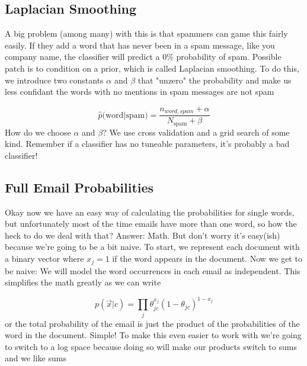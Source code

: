 \subsection{Laplacian Smoothing}
A big problem (among many) with this is that spammers can game this fairly easily. If they add a word that has never been in a spam message, like you company name, the classifier will predict a $0\%$ probability of spam. Possible patch is to condition on a prior, which is called Laplacian smoothing. To do this, we introduce two constants $\alpha$ and $\beta$ that "unzero" the probability and make us less confidant the words with no mentions in spam messages are not spam

\begin{equation}
    \hat{p}(\text{word|spam)} = \frac{n_{word,spam} + \alpha}{N_\text{spam} + \beta}
\end{equation}
How do we choose $\alpha$ and $\beta$? We use cross validation and a grid search of some kind. Remember if a classifier has no tuneable parameters, it's probably a bad classifier!

\subsection{Full Email Probabilities}
Okay now we have an easy way of calculating the probabilities for single words, but unfortunately most of the time emails have more than one word, so how the heck to do we deal with that? Answer: Math. But don't worry it's easy(ish) because we're going to be a bit naive. 
To start, we represent each document with a binary vector where $x_j = 1$ if the word appears in the document. Now we get to be naive: We will model the word occurrences in each email as independent. This simplifies the math greatly as we can write 

\begin{equation}
    p(\vec{x}|c) = \prod_j \theta_{jc}^{x_j} (1-\theta_{jc})^{1-x_j}
\end{equation}
or the total probability of the email is just the product of the probabilities of the word in the document. Simple! To make this even easier to work with we're going to switch to a log space because doing so will make our products switch to sums and we like sums

